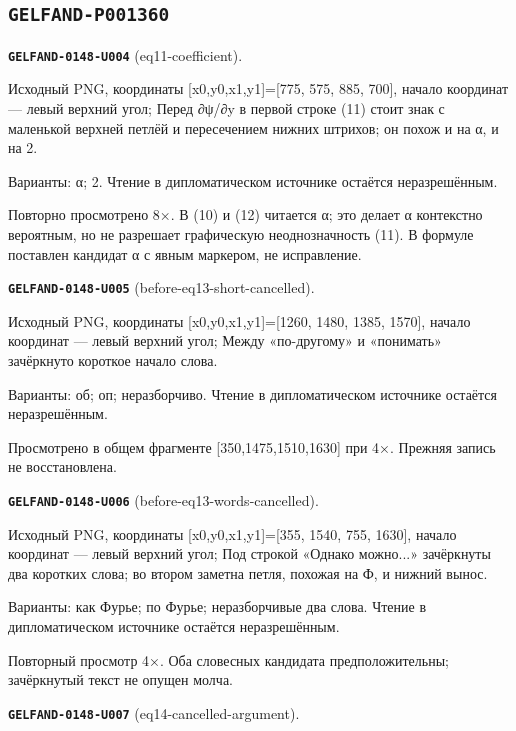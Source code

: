 \documentclass[11pt]{article}
\theoremstyle{definition}
\theoremstyle{remark}
\begin{document}
\subsection*{\texttt{GELFAND-P001360}}
\noindent\leavevmode{}\label{GELFAND-P001360:eq11-coefficient:note}\textbf{\texttt{GELFAND-0148-U004}} (eq11-coefficient).\par\nopagebreak[4]
Исходный PNG, координаты [x0,y0,x1,y1]=[775, 575, 885, 700], начало координат — левый верхний угол; Перед ∂ψ/∂y в первой строке (11) стоит знак с маленькой верхней петлёй и пересечением нижних штрихов; он похож и на α, и на 2.\par
Варианты: α; 2. Чтение в дипломатическом источнике остаётся неразрешённым.\par
Повторно просмотрено 8×. В (10) и (12) читается α; это делает α контекстно вероятным, но не разрешает графическую неоднозначность (11). В формуле поставлен кандидат α с явным маркером, не исправление.\par\medskip
\noindent\leavevmode{}\label{GELFAND-P001360:before-eq13-short-cancelled:note}\textbf{\texttt{GELFAND-0148-U005}} (before-eq13-short-cancelled).\par\nopagebreak[4]
Исходный PNG, координаты [x0,y0,x1,y1]=[1260, 1480, 1385, 1570], начало координат — левый верхний угол; Между «по-другому» и «понимать» зачёркнуто короткое начало слова.\par
Варианты: об; оп; неразборчиво. Чтение в дипломатическом источнике остаётся неразрешённым.\par
Просмотрено в общем фрагменте [350,1475,1510,1630] при 4×. Прежняя запись не восстановлена.\par\medskip
\noindent\leavevmode{}\label{GELFAND-P001360:before-eq13-words-cancelled:note}\textbf{\texttt{GELFAND-0148-U006}} (before-eq13-words-cancelled).\par\nopagebreak[4]
Исходный PNG, координаты [x0,y0,x1,y1]=[355, 1540, 755, 1630], начало координат — левый верхний угол; Под строкой «Однако можно...» зачёркнуты два коротких слова; во втором заметна петля, похожая на Ф, и нижний вынос.\par
Варианты: как Фурье; по Фурье; неразборчивые два слова. Чтение в дипломатическом источнике остаётся неразрешённым.\par
Повторный просмотр 4×. Оба словесных кандидата предположительны; зачёркнутый текст не опущен молча.\par\medskip
\noindent\leavevmode{}\label{GELFAND-P001360:eq14-cancelled-argument:note}\textbf{\texttt{GELFAND-0148-U007}} (eq14-cancelled-argument).\par\nopagebreak[4]
\end{document}
